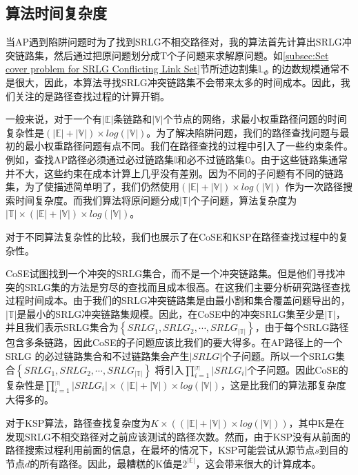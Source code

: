 \subsection{算法时间复杂度}
\label{subsec:Complexity analysis}
当AP遇到陷阱问题时为了找到SRLG不相交路径对，我的算法首先计算出SRLG冲突链路集，然后通过把原问题划分成T个子问题来求解原问题。如\ref{subsec:Set cover problem for SRLG Conflicting Link Set}节所述边割集$\mathbb{L}_{\Phi}$ 的边数规模通常不是很大，因此，本算法寻找SRLG冲突链路集不会带来太多的时间成本。因此，我们关注的是路径查找过程的计算开销。

一般来说，对于一个有$|\mathbb{E}|$条链路和$|\mathbb{V}|$个节点的网络，求最小权重路径问题的时间复杂性是$(|\mathbb{E}|+|\mathbb{V}|)\times log(|\mathbb{V}|)$。为了解决陷阱问题，我们的路径查找问题与最初的最小权重路径问题有点不同。我们在路径查找的过程中引入了一些约束条件。例如，查找AP路径必须通过必过链路集$\mathbb{I}$和必不过链路集$\mathbb{O}$。由于这些链路集通常并不大，这些约束在成本计算上几乎没有差别。因为不同的子问题有不同的链路集，为了使描述简单明了，我们仍然使用$(|\mathbb{E}|+|\mathbb{V}|)\times log(|\mathbb{V}|)$ 作为一次路径搜索时间复杂度。而我们算法将原问题分成$|\mathbb{T}|$个子问题，算法复杂度为$|\mathbb{T}|\times(|\mathbb{E}|+|\mathbb{V}|)\times log(|\mathbb{V}|)$。


对于不同算法复杂性的比较，我们也展示了在CoSE\cite{rostami2007cose}和KSP\cite{eppstein1998finding}在路径查找过程中的复杂性。

CoSE试图找到一个冲突的SRLG集合，而不是一个冲突链路集。但是他们寻找冲突的SRLG集的方法是穷尽的查找而且成本很高。在这我们主要分析研究路径查找过程时间成本。由于我们的SRLG冲突链路集是由最小割和集合覆盖问题导出的，$|\mathbb{T}|$是最小的SRLG冲突链路集规模。因此，在CoSE中的冲突SRLG集至少是$|\mathbb{T}|$，并且我们表示SRLG集合为$\left\{ {SRL{G_1},SRL{G_2}, \cdots ,SRL{G_{|\mathbb{T}|}}} \right\}$，由于每个SRLG路径包含多条链路，因此CoSE的子问题应该比我们的要大得多。在AP路径上的一个SRLG 的必过链路集合和不过链路集会产生$|SRLG|$个子问题。所以一个SRLG集合$\left\{ {SRL{G_1},SRL{G_2}, \cdots ,SRL{G_{|\mathbb{T}|}}} \right\}$ 将引入$\prod\limits_{i = 1}^{_{\left| T \right|}} {\left| {SRL{G_i}} \right|}$个子问题。因此CoSE的复杂性是$\prod\limits_{i = 1}^{_{|\mathbb{T}|}} {\left| {SRL{G_i}} \right|}\times (|\mathbb{E}|+|\mathbb{V}|)\times log(|\mathbb{V}|)$，这是比我们的算法那复杂度大得多的。

对于KSP算法\cite{eppstein1998finding}，路径查找复杂度为$K\times ((|\mathbb{E}|+|\mathbb{V}|)\times log(|\mathbb{V}|))$，其中K是在发现SRLG不相交路径对之前应该测试的路径次数。然而，由于KSP没有从前面的路径搜索过程利用前面的信息，在最坏的情况下，KSP可能尝试从源节点$s$到目的节点$d$的所有路径。因此，最糟糕的K值是$2^{|\mathbb{E}|}$，这会带来很大的计算成本。

